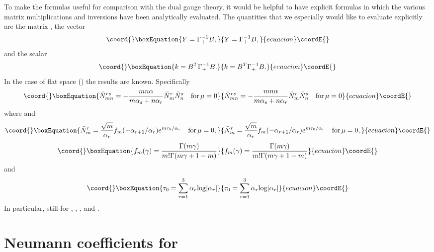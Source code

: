 \documentclass[a4paper,12pt]{article}
\begin{document}
To make the formulas useful for comparison with the dual gauge
theory, it would be helpful to have explicit formulas in which the
various matrix multiplications and inversions have been
analytically evaluated. The quantities that we especially would
like to evaluate explicitly are the matrix \coordHE{}, the
vector
\begin{equation}\coord{}\boxEquation{
Y =\Gamma_+^{-1} B,
}{
Y =\Gamma_+^{-1} B,
}{ecuacion}\coordE{}\end{equation}
and the scalar
\begin{equation}\coord{}\boxEquation{
k = B^T \Gamma_+^{-1} B.
}{
k = B^T \Gamma_+^{-1} B.
}{ecuacion}\coordE{}\end{equation}
In the case of flat space (\coordHE{}) the results are known. Specifically
\begin{equation}\coord{}\boxEquation{ \label{factorize}
\bar N_{mn}^{rs} = - {mn\alpha \over m\alpha_s + n \alpha_r} \bar
N_m^r \bar N_n^s \quad {\rm for}\,  \mu =0
}{ \bar N_{mn}^{rs} = - {mn\alpha \over m\alpha_s + n \alpha_r} \bar
N_m^r \bar N_n^s \quad {\rm for}\,  \mu =0
}{ecuacion}\coordE{}\end{equation}
where \coordHE{} and
\begin{equation}\coord{}\boxEquation{ \label{Nrflat}
\bar N_m^r = {\sqrt{m} \over \alpha_r} f_m(-\alpha_{r+1}/\alpha_r)
e^{m\tau_0 /\alpha_r} \quad {\rm for}\,  \mu =0,
}{ \bar N_m^r = {\sqrt{m} \over \alpha_r} f_m(-\alpha_{r+1}/\alpha_r)
e^{m\tau_0 /\alpha_r} \quad {\rm for}\,  \mu =0,
}{ecuacion}\coordE{}\end{equation}
\begin{equation}\coord{}\boxEquation{
f_m(\gamma) = {\Gamma(m\gamma) \over m! \Gamma (m\gamma +1 -m)}
}{
f_m(\gamma) = {\Gamma(m\gamma) \over m! \Gamma (m\gamma +1 -m)}
}{ecuacion}\coordE{}\end{equation}
and
\begin{equation}\coord{}\boxEquation{
\tau_0 = \sum_{r=1}^3 \alpha_r {\rm log} |\alpha_r|
}{
\tau_0 = \sum_{r=1}^3 \alpha_r {\rm log} |\alpha_r|
}{ecuacion}\coordE{}\end{equation}
In particular, still for \coordHE{}, \coordHE{}, \coordHE{}, and \coordHE{}.

\section{Neumann coefficients for \coordHE{}}
\end{document}
